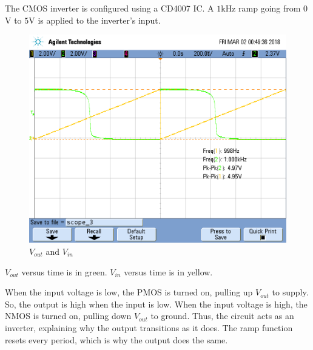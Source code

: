 The CMOS inverter is configured using a CD4007 IC.
A $1$\si{\kilo\hertz} ramp going from $0$\si{\volt} to $5$\si{\volt} is applied to the inverter's input.

\FloatBarrier

\begin{figure}[h!]
	\centering
	\includegraphics[scale=0.30]{./images/vout_and_vin_inverter_alt.png}
	\caption{$V_{out}$ and $V_{in}$}
	\label{fig:vout_and_vin_inverter_alt}
\end{figure}

\FloatBarrier

{\footnotesize $V_{out}$ versus time is in green. $V_{in}$ versus time is in yellow.}

\FloatBarrier

When the input voltage is low, the PMOS is turned on, pulling up $V_{out}$ to supply.
So, the output is high when the input is low.
When the input voltage is high, the NMOS is turned on, pulling down $V_{out}$ to ground.
Thus, the circuit acts as an inverter, explaining why the output transitions as it does.
The ramp function resets every period, which is why the output does the same.

\FloatBarrier

